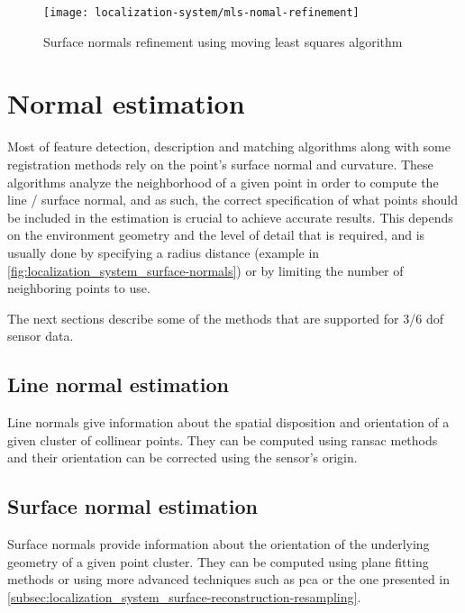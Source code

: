 \begin{figure}[H]
	\centering
	\texttt{[image: localization-system/mls-nomal-refinement]}
	\caption[Surface normals refinement using moving least squares algorithm]{Surface normals refinement using moving least squares algorithm \cite{Rusu2010a}}
	\label{fig:localization_system_mls-nomal-refinement}
\end{figure}



\section{Normal estimation}

Most of feature detection, description and matching algorithms along with some registration methods rely on the point's surface normal and curvature. These algorithms analyze the neighborhood of a given point in order to compute the line / surface normal, and as such, the correct specification of what points should be included in the estimation is crucial to achieve accurate results. This depends on the environment geometry and the level of detail that is required, and is usually done by specifying a radius distance (example in \cref{fig:localization_system_surface-normals}) or by limiting the number of neighboring points to use.

The next sections describe some of the methods that are supported for 3/6 \gls{dof} sensor data.


\subsection{Line normal estimation}

Line normals give information about the spatial disposition and orientation of a given cluster of collinear points. They can be computed using \gls{ransac} methods \cite{Fischler1981} and their orientation can be corrected using the sensor's origin.


\subsection{Surface normal estimation}

Surface normals provide information about the orientation of the underlying geometry of a given point cluster. They can be computed using plane fitting methods or using more advanced techniques such as \gls{pca} \cite{Jolliffe2002} or the one presented in \cref{subsec:localization_system_surface-reconstruction-resampling}.

